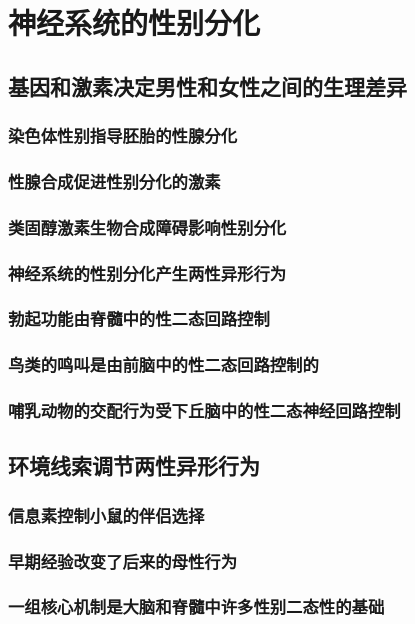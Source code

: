 \chapter{神经系统的性别分化}


\section{基因和激素决定男性和女性之间的生理差异}
\subsection{染色体性别指导胚胎的性腺分化}
\subsection{性腺合成促进性别分化的激素}
\subsection{类固醇激素生物合成障碍影响性别分化}

\subsection{神经系统的性别分化产生两性异形行为}
\subsection{勃起功能由脊髓中的性二态回路控制}
\subsection{鸟类的鸣叫是由前脑中的性二态回路控制的}
\subsection{哺乳动物的交配行为受下丘脑中的性二态神经回路控制}

\section{环境线索调节两性异形行为}
\subsection{信息素控制小鼠的伴侣选择}
\subsection{早期经验改变了后来的母性行为}
\subsection{一组核心机制是大脑和脊髓中许多性别二态性的基础}

